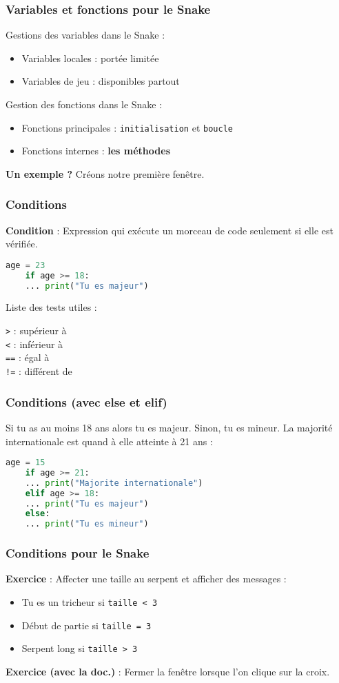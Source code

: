 \documentclass{beamer}
\begin{document}
\begin{frame}[fragile]
    \frametitle{Variables et fonctions pour le Snake}
    Gestions des variables dans le Snake :
    \begin{itemize}
        \item Variables locales : portée limitée
        \item Variables de jeu : disponibles partout
    \end{itemize}
    Gestion des fonctions dans le Snake :
    \begin{itemize}
        \item Fonctions principales : \texttt{initialisation} et \texttt{boucle}
        \item Fonctions internes : \textbf{les méthodes}
    \end{itemize}
    \textbf{Un exemple ?} Créons notre première fenêtre.
\end{frame}

\begin{frame}[fragile]
    \frametitle{Conditions}
    \textbf{Condition} : Expression qui exécute un morceau de code seulement si elle est vérifiée.
    \medbreak
    \begin{lstlisting}[language=python]
    age = 23
    if age >= 18:
    ... print("Tu es majeur")
    \end{lstlisting}
    \medbreak
    Liste des tests utiles :
    
    \texttt{>}  : supérieur à\\
    \texttt{<}  : inférieur à\\
    \texttt{==} : égal à\\
    \texttt{!=} : différent de\\
    \medbreak
\end{frame}

\begin{frame}[fragile]
    \frametitle{Conditions (avec else et elif)}
    Si tu as au moins 18 ans alors tu es majeur.
    Sinon, tu es mineur.
    La majorité internationale est quand à elle atteinte à 21 ans :
    \medbreak
    \begin{lstlisting}[language=python]
    age = 15
    if age >= 21:
    ... print("Majorite internationale")
    elif age >= 18:
    ... print("Tu es majeur")
    else:
    ... print("Tu es mineur")
    \end{lstlisting}
\end{frame}

\begin{frame}
    \frametitle{Conditions pour le Snake}
    \textbf{Exercice} : Affecter une taille au serpent et afficher des messages :
    \begin{itemize}
        \item Tu es un tricheur si \texttt{taille < 3}
        \item Début de partie si \texttt{taille = 3}
        \item Serpent long si \texttt{taille > 3}
    \end{itemize}
    \textbf{Exercice (avec la doc.)} : Fermer la fenêtre lorsque l'on clique sur la croix.
\end{frame}
\end{document}
